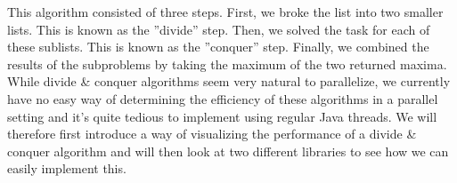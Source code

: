 \documentclass[main.tex]{subfiles}
\begin{document}
This algorithm consisted of three steps. First, we broke the list into two smaller lists. This is known as the ''divide'' step. Then, we solved the task for each of these sublists. This is known as the ''conquer'' step. Finally, we combined the results of the subproblems by taking the maximum of the two returned maxima.\\[0.3cm]
While divide \& conquer algorithms seem very natural to parallelize, we currently have no easy way of determining the efficiency of these algorithms in a parallel setting and it's quite tedious to implement using regular Java threads. We will therefore first introduce a way of visualizing the performance of a divide \& conquer algorithm and will then look at two different libraries to see how we can easily implement this.

\end{document}
